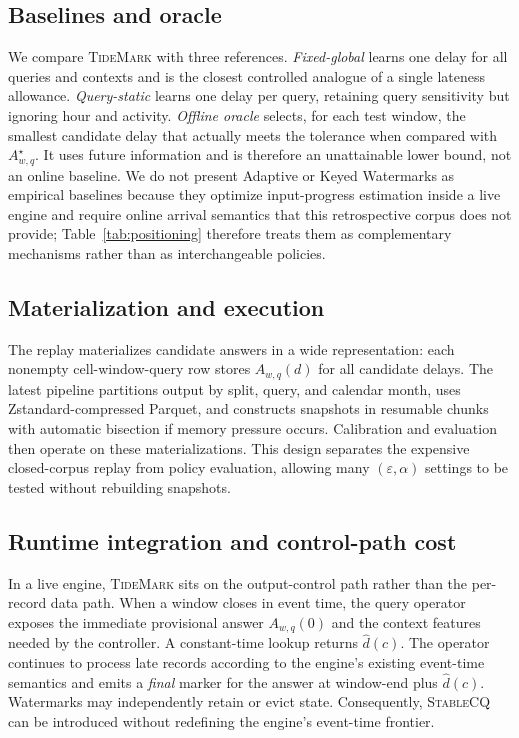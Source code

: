 \documentclass[conference]{IEEEtran}
\newcommand{\stablecq}{\textsc{StableCQ}}
\newcommand{\tidemark}{\textsc{TideMark}}
\newcommand{\eps}{\varepsilon}
\begin{document}
\subsection{Baselines and oracle}
We compare \tidemark{} with three references. \emph{Fixed-global} learns one delay for all queries and contexts and is the closest controlled analogue of a single lateness allowance. \emph{Query-static} learns one delay per query, retaining query sensitivity but ignoring hour and activity. \emph{Offline oracle} selects, for each test window, the smallest candidate delay that actually meets the tolerance when compared with $A_{w,q}^{\star}$. It uses future information and is therefore an unattainable lower bound, not an online baseline. We do not present Adaptive or Keyed Watermarks as empirical baselines because they optimize input-progress estimation inside a live engine and require online arrival semantics that this retrospective corpus does not provide; Table~\ref{tab:positioning} therefore treats them as complementary mechanisms rather than as interchangeable policies.

\subsection{Materialization and execution}
The replay materializes candidate answers in a wide representation: each nonempty cell-window-query row stores $A_{w,q}(d)$ for all candidate delays. The latest pipeline partitions output by split, query, and calendar month, uses Zstandard-compressed Parquet, and constructs snapshots in resumable chunks with automatic bisection if memory pressure occurs. Calibration and evaluation then operate on these materializations. This design separates the expensive closed-corpus replay from policy evaluation, allowing many $(\eps,\alpha)$ settings to be tested without rebuilding snapshots.

\subsection{Runtime integration and control-path cost}
In a live engine, \tidemark{} sits on the output-control path rather than the per-record data path. When a window closes in event time, the query operator exposes the immediate provisional answer $A_{w,q}(0)$ and the context features needed by the controller. A constant-time lookup returns $\widehat d(c)$. The operator continues to process late records according to the engine's existing event-time semantics and emits a \emph{final} marker for the answer at window-end plus $\widehat d(c)$. Watermarks may independently retain or evict state. Consequently, \stablecq{} can be introduced without redefining the engine's event-time frontier.
\end{document}
